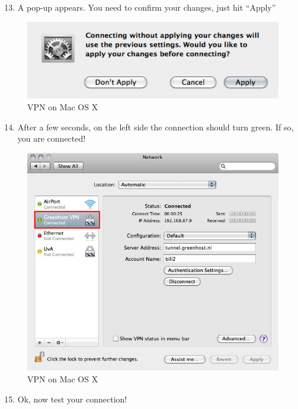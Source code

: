 \begin{enumerate}[1.]
\setcounter{enumi}{12}
\item
  A pop-up appears. You need to confirm your changes, just hit ``Apply''
\end{enumerate}
\begin{figure}[htbp]
\centering
\includegraphics{vpn_osx_12.jpg}
\caption{VPN on Mac OS X}
\end{figure}

\begin{enumerate}[1.]
\setcounter{enumi}{13}
\item
  After a few seconds, on the left side the connection should turn
  green. If so, you are connected!
\end{enumerate}
\begin{figure}[htbp]
\centering
\includegraphics{vpn_osx_13.jpg}
\caption{VPN on Mac OS X}
\end{figure}

\begin{enumerate}[1.]
\setcounter{enumi}{14}
\item
  Ok, now test your connection!
\end{enumerate}
